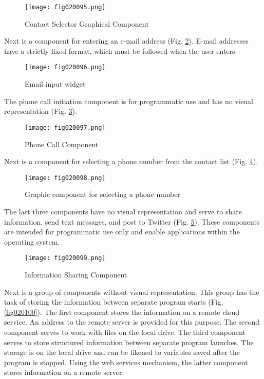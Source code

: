 \begin{figure}[H]
   \centering
   \texttt{[image: fig020095.png]}
   \caption{Contact Selector Graphical Component}
\label{fig020095}
\end{figure}

Next is a component for entering an e-mail address (Fig. \ref{fig020096}). E-mail addresses have a strictly fixed format, which must be followed when the user enters.

\begin{figure}[H]
   \centering
   \texttt{[image: fig020096.png]}
   \caption{Email input widget}
\label{fig020096}
\end{figure}

The phone call initiation component is for programmatic use and has no visual representation (Fig. \ref{fig020097}).

\begin{figure}[H]
   \centering
   \texttt{[image: fig020097.png]}
   \caption{Phone Call Component}
\label{fig020097}
\end{figure}

Next is a component for selecting a phone number from the contact list (Fig. \ref{fig020098}).

\begin{figure}[H]
   \centering
   \texttt{[image: fig020098.png]}
   \caption{Graphic component for selecting a phone number}
\label{fig020098}
\end{figure}

The last three components have no visual representation and serve to share information, send text messages, and post to Twitter (Fig. \ref{fig020099}). These components are intended for programmatic use only and enable applications within the operating system.

\begin{figure}[H]
   \centering
   \texttt{[image: fig020099.png]}
   \caption{Information Sharing Component}
\label{fig020099}
\end{figure}

Next is a group of components without visual representation. This group has the task of storing the information between separate program starts (Fig. \ref{fig020100}). The first component stores the information on a remote cloud service. An address to the remote server is provided for this purpose. The second component serves to work with files on the local drive. The third component serves to store structured information between separate program launches. The storage is on the local drive and can be likened to variables saved after the program is stopped. Using the web services mechanism, the latter component stores information on a remote server.

